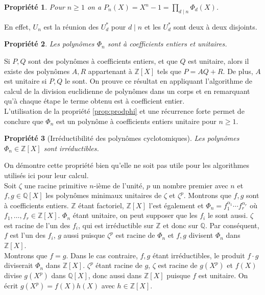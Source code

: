 \documentclass{article}
\theoremstyle{break}                  %
\newtheorem{propriete}{Propriété}
\begin{document}
\begin{propriete}
	Pour $n \ge 1$ on a $P_n(X) = X^n-1 = \prod_{ d \mid n} \Phi_d(X)$.
\end{propriete}
En effet, $U_n$ est la réunion des $U_d^*$ pour $d \mid n$ et les $U_d^*$ sont deux à deux disjoints.

\begin{propriete}
	Les polynômes $\Phi_n$ sont à coefficients entiers et unitaires.
\end{propriete}
Si $P, Q$ sont des polynômes à coefficients entiers, et que $Q$ est unitaire, alors il existe des polynômes $A,R$ appartenant à $\mathbb Z[X]$ tels que $P = AQ + R$. De plus, $A$ est unitaire si $P, Q$ le sont. On prouve ce résultat en appliquant l'algorithme de calcul de la division euclidienne de polynômes dans un corps et en remarquant qu'à chaque étape le terme obtenu est à coefficient entier.\\
L'utilisation de la propriété \ref{prop:prodphi} et une récurrence forte permet de conclure que $\Phi_n$ est un polynôme à coefficients entiers unitaire pour $n \ge 1$.

\begin{propriete}[Irréductibilité des polynômes cyclotomiques]
	Les polynômes $\Phi_n \in \mathbb Z[X]$ sont irréductibles.
\end{propriete}
On démontre cette propriété bien qu'elle ne soit pas utile pour les algorithmes utilisés ici pour leur calcul.\\

Soit $\zeta$ une racine primitive $n$-ième de l'unité, $p$ un nombre premier avec $n$ et $f,g \in \mathbb Q[X]$ les polynômes minimaux unitaires de $\zeta$ et $\zeta^p$. Montrons que $f,g$ sont à coefficients entiers. $\mathbb Z$ étant factoriel, $\mathbb Z[X]$ l'est également et $\Phi_n = f_1^{\alpha_1} \cdots f_r^{\alpha_r}$ où $f_1, \dots ,f_r \in \mathbb Z[X]$. $\Phi_n$ étant unitaire, on peut supposer que les $f_i$ le sont aussi. $\zeta$ est racine de l'un des $f_i$, qui est irréductible sur $\mathbb Z$ et donc sur $\mathbb Q$. Par conséquent, $f$ est l'un des $f_i$, $g$ aussi puisque $\zeta^p$ est racine de $\Phi_n$ et $f,g$ divisent $\Phi_n$ dans $\mathbb Z[X]$.\\

Montrons que $f=g$. Dans le cas contraire, $f,g$ étant irréductibles, le produit $f \cdot g$ diviserait $\Phi_n$ dans $\mathbb Z[X]$. $\zeta^p$ étant racine de $g$, $\zeta$ est racine de $g(X^p)$ et $f(X)$ divise $g(X^p)$ dans $\mathbb Q[X]$, donc aussi dans $\mathbb Z[X]$ puisque $f$ est unitaire. On écrit $g(X^p) = f(X)h(X)$ avec $h \in \mathbb Z[X]$.\\
\end{document}
